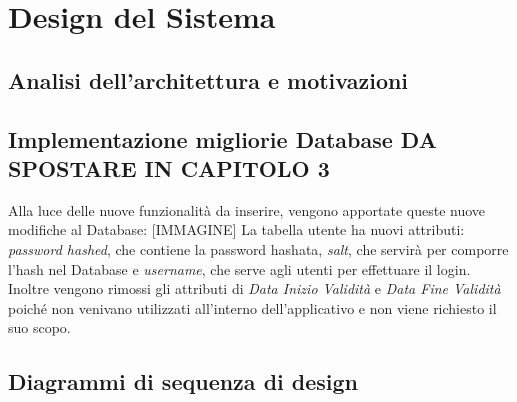 \chapter{Design del Sistema}
\raggedright{\section{Analisi dell'architettura e motivazioni}}

\raggedright{\section{Implementazione migliorie Database DA SPOSTARE IN CAPITOLO 3}}
Alla luce delle nuove funzionalità da inserire, vengono apportate queste nuove modifiche al Database: 
[IMMAGINE] 
La tabella utente ha nuovi attributi: \textit{password hashed}, che contiene la password hashata, \textit{salt}, che servirà per comporre l'hash nel Database e \textit{username}, che serve agli utenti per effettuare il login. Inoltre vengono rimossi gli attributi di \textit{Data Inizio Validità} e \textit{Data Fine Validità} poiché non venivano utilizzati all'interno dell'applicativo e non viene richiesto il suo scopo.
\raggedright{\section{Diagrammi di sequenza di design}}
